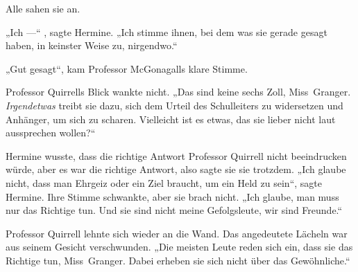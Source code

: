 Alle sahen sie an.

„Ich —“ , sagte Hermine.
„Ich stimme ihnen, bei dem was sie gerade gesagt haben, in keinster Weise zu, nirgendwo.“

„Gut gesagt“, kam Professor McGonagalls klare Stimme.

Professor Quirrells Blick wankte nicht.
„Das sind keine sechs Zoll, Miss~Granger. \emph{Irgendetwas} treibt sie dazu, sich dem Urteil des Schulleiters zu widersetzen und Anhänger, um sich zu scharen. Vielleicht ist es etwas, das sie lieber nicht laut aussprechen wollen?“

Hermine wusste, dass die richtige Antwort Professor Quirrell nicht beeindrucken würde, aber es war die richtige Antwort, also sagte sie sie trotzdem.
„Ich glaube nicht, dass man Ehrgeiz oder ein Ziel braucht, um ein Held zu sein“, sagte Hermine. Ihre Stimme schwankte, aber sie brach nicht.
„Ich glaube, man muss nur das Richtige tun. Und sie sind nicht meine Gefolgsleute, wir sind Freunde.“

Professor Quirrell lehnte sich wieder an die Wand. Das angedeutete Lächeln war aus seinem Gesicht verschwunden.
„Die meisten Leute reden sich ein, dass sie das Richtige tun, Miss~Granger. Dabei erheben sie sich nicht über das Gewöhnliche.“

